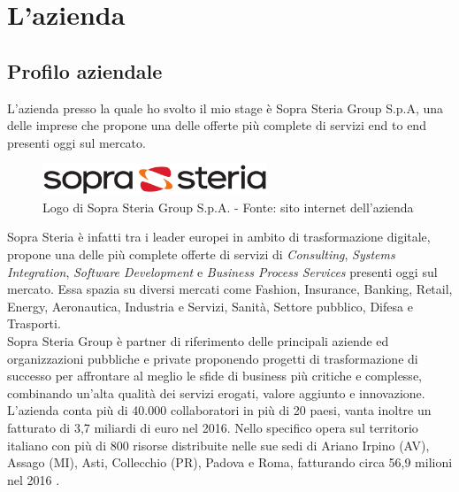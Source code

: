 

\chapter{L'azienda}

\section{Profilo aziendale}
L'azienda presso la quale ho svolto il mio stage è Sopra Steria Group S.p.A, una delle imprese che propone una delle offerte più complete di servizi end to end presenti oggi sul mercato.\\

\begin{figure}[H]
	\centering
   	\includegraphics[width=0.6\textwidth]{immagini/logo_azienda}
   	\caption{Logo di Sopra Steria Group S.p.A. - Fonte: sito internet dell'azienda}
\end{figure}

Sopra Steria è infatti tra i leader europei in ambito di trasformazione digitale, propone una delle più complete offerte di servizi di \textit{Consulting}, \textit{Systems Integration}, \textit{Software Development} e \textit{Business Process Services} presenti oggi sul mercato.
Essa spazia su diversi mercati come Fashion, Insurance, Banking, Retail, Energy, Aeronautica, Industria e Servizi, Sanità, Settore pubblico, Difesa e Trasporti.\\

Sopra Steria Group è partner di riferimento delle principali aziende ed organizzazioni pubbliche e private proponendo progetti di trasformazione di successo per affrontare al meglio le sfide di business più critiche e complesse, combinando un'alta qualità dei servizi erogati, valore aggiunto e innovazione.\\

L'azienda conta più di 40.000 collaboratori in più di 20 paesi, vanta inoltre un fatturato di 3,7 miliardi di euro nel 2016. Nello specifico opera sul territorio italiano con più di 800 risorse distribuite nelle sue sedi di Ariano Irpino (AV), Assago (MI), Asti, Collecchio (PR), Padova e Roma, fatturando circa 56,9 milioni nel 2016 .\\

